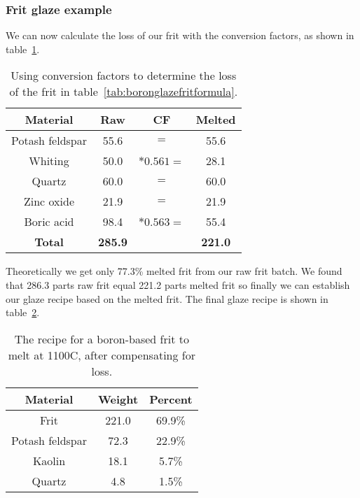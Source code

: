 \subsubsection{Frit glaze example}
We can now calculate the loss of our frit with the conversion factors, as 
shown in table~\ref{tab:boronglazefritcf}.
\begin{center}
  \renewcommand{\arraystretch}{1.5}
  \begin{table}\centering
    \begin{tabular}{|c|c|c|c|}\hline
      \textbf{Material}&\textbf{Raw}&\textbf{CF}&\textbf{Melted}\\\hline\hline
      Potash feldspar&55.6&$=$&55.6\\\hline
      Whiting&50.0&$*0.561=$&28.1\\\hline
      Quartz&60.0&$=$&60.0\\\hline
      Zinc oxide&21.9&$=$&21.9\\\hline
      Boric acid&98.4&$*0.563=$&55.4\\\hline\hline
      \textbf{Total}&\textbf{285.9}&&\textbf{221.0}\\\hline
    \end{tabular}
    \caption{Using conversion factors to determine the loss of the frit in 
    table~\ref{tab:boronglazefritformula}.}
    \label{tab:boronglazefritcf}
  \end{table}
\end{center}
Theoretically we get only 77.3\% melted frit from our raw frit batch. We found 
that 286.3 parts raw frit equal 221.2 parts melted frit so finally we can 
establish our glaze recipe based on the melted frit. The final glaze recipe is 
shown in table~\ref{tab:boronglazefritfinal}.
\begin{center}
  \renewcommand{\arraystretch}{1.5}
  \begin{table}\centering
    \begin{tabular}{|c|c|c|}\hline
      \textbf{Material}&\textbf{Weight}&\textbf{Percent}\\\hline\hline
      Frit&221.0&69.9\%\\\hline
      Potash feldspar&72.3&22.9\%\\\hline
      Kaolin&18.1&5.7\%\\\hline
      Quartz&4.8&1.5\%\\\hline
    \end{tabular}
    \caption{The recipe for a boron-based frit to melt at 1100\degree C, after 
    compensating for loss.}
    \label{tab:boronglazefritfinal}
  \end{table}
\end{center}
